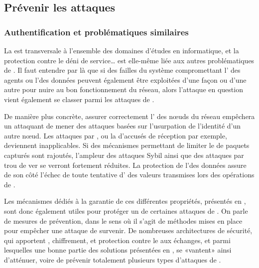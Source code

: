 \subsection{Prévenir les attaques}

    \subsubsection{Authentification et problématiques similaires}
    La \secu est transversale à l'ensemble des domaines d'études en informatique, et la protection contre le déni de service… est elle-même liée aux autres problématiques de \secu.
Il faut entendre par là que si des failles du système compromettant l' des agents ou l'\integrite des données peuvent également être exploitées d'une façon ou d'une autre pour nuire au bon fonctionnement du réseau, alors l'attaque en question vient également se classer parmi les attaques de \dds.

De manière plus concrète, assurer correctement l' des nœuds du réseau empêchera un attaquant de mener des attaques basées sur l'usurpation de l'identité d'un autre nœud.
Les attaques par \desync, ou la  d'accusés de réception par exemple, deviennent inapplicables.
Si des mécanismes permettant de limiter le  de paquets capturés sont rajoutés, l'ampleur des attaques Sybil ainsi que des attaques par trou de ver se verront fortement réduites.
La protection de l'\integrite des données assure de son côté l'échec de toute tentative d' des valeurs transmises lors des opérations de .

Les mécanismes dédiés à la garantie de ces différentes propriétés, présentés en , sont donc également utiles pour protéger un \rc de certaines attaques de \dds.
On parle de mesures de prévention, dans le sens où il s'agit de méthodes mises en place pour empêcher une attaque de survenir.
De nombreuses architectures de sécurité, qui apportent , chiffrement, \integrite et protection contre le  aux échanges, et parmi lesquelles une bonne partie des solutions présentées en , se «vantent» ainsi d'atténuer, voire de prévenir totalement plusieurs types d'attaques de \dds.

